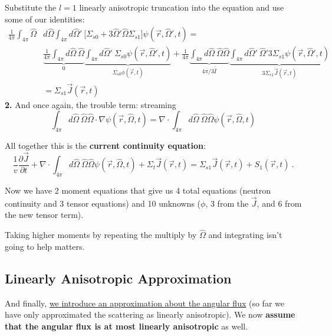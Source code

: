 \documentclass[12pt]{article}
\newcommand{\vOmega}{\ensuremath{\hat{\Omega}}}
\begin{document}
Substitute the $l=1$ linearly anisotropic truncation into the equation and use some of our identities:
%
\begin{align*}
\frac{1}{4\pi} \int_{4\pi}  \vOmega &d\vOmega \int_{4\pi} d\vOmega'\: \bigl[\Sigma_{s0} + 3\vOmega' \vOmega \Sigma_{s1} \bigr] \psi(\vec{r}, \vOmega', t) = \nonumber\\
%
& \underbrace{\frac{1}{4\pi} \int_{4\pi} d\vOmega \:\vOmega}_{0}  \underbrace{\int_{4\pi} d\vOmega'\:  \Sigma_{s0}\psi(\vec{r}, \vOmega', t)}_{\Sigma_{s0} \phi(\vec{r},t)} +
%
\frac{1}{4\pi} \underbrace{\int_{4\pi} d\vOmega \:\vOmega \vOmega}_{4\pi/3 \bar{\bar{I}}} \underbrace{\int_{4\pi} d\vOmega'\: \vOmega' 3  \Sigma_{s1}\psi(\vec{r}, \vOmega', t)}_{3\Sigma_{s1} \vec{J}(\vec{r},t)} \\
%
&= \boxed{\Sigma_{s1} \vec{J}(\vec{r},t)}
\end{align*}
\textbf{2.} And once again, the trouble term: streaming
%
\[\int_{4\pi} d\vOmega \:\vOmega \vOmega \cdot \nabla \psi(\vec{r}, \vOmega, t) = \nabla \cdot \int_{4\pi} d\vOmega \:\vOmega \vOmega \psi(\vec{r}, \vOmega, t) \]

\vspace*{2em}
All together this is the \textbf{current continuity equation}:
\begin{equation}
\frac{1}{v}\frac{\partial \vec{J}}{\partial t} 
+ \nabla \cdot \int_{4\pi} d\vOmega \:\vOmega \vOmega \psi(\vec{r}, \vOmega, t) +
\Sigma_t  \vec{J}(\vec{r}, t) =
\Sigma_{s1} \vec{J}(\vec{r},t)
+ S_{1}(\vec{r}, t) \:.
\label{eq:currentcont}
\end{equation}

Now we have 2 moment equations that give us 4 total equations (neutron continuity and 3 tensor equations) and 10 unknowns ($\phi$, 3 from the $\vec{J}$, and 6 from the new tensor term). 

Taking higher moments by repeating the multiply by $\vOmega$ and integrating isn't going to help matters.


\subsection*{Linearly Anisotropic Approximation}
And finally, \underline{we introduce an approximation about the angular flux} (so far we have only approximated the scattering as linearly anisotropic). We now \textbf{assume that the angular flux is at most linearly anisotropic} as well.
\end{document}
